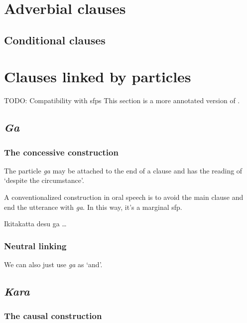 \documentclass[UTF8, a4paper, oneside, scheme=plain]{ctexrep}
\newcommand*{\citesec}[1]{\S~{#1}}
\newcommand{\corpus}[1]{\emph{#1}}
\newcommand{\translate}[1]{`#1'}
\begin{document}
\section{Adverbial clauses}

\subsection{Conditional clauses}

\section{Clauses linked by particles}\label{sec:particle-linking-clause}

TODO: Compatibility with \ac{sfp}s
This section is a more annotated version of \citet[\citesec{6.3}]{akiyama2012japanese}.

\subsection{\corpus{Ga}}

\subsubsection{The concessive construction}

The particle \corpus{ga} may be attached to the end of a clause 
and has the reading of \translate{despite the circumstance}.

A conventionalized construction in oral speech is to avoid the main clause 
and end the utterance with \corpus{ga}.
In this way, it's a marginal \ac{sfp}.

\begin{exe}
    \ex Ikitakatta desu ga \dots
\end{exe}

\subsubsection{Neutral linking}

We can also just use \corpus{ga} as \translate{and}.

\subsection{\corpus{Kara}}

\subsubsection{The causal construction}



\end{document}
